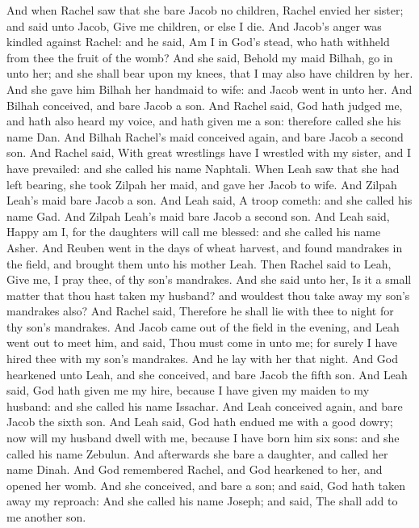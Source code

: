 \begin{biblechapter} %
\verse And when Rachel saw that she bare Jacob no children, Rachel envied her sister; and said unto Jacob, Give me children, or else I die.
\verse And Jacob's anger was kindled against Rachel: and he said, Am I in God's stead, who hath withheld from thee the fruit of the womb?
\verse And she said, Behold my maid Bilhah, go in unto her; and she shall bear upon my knees, that I may also have children by her.
\verse And she gave him Bilhah her handmaid to wife: and Jacob went in unto her.
\verse And Bilhah conceived, and bare Jacob a son.
\verse And Rachel said, God hath judged me, and hath also heard my voice, and hath given me a son: therefore called she his name Dan.
\verse And Bilhah Rachel's maid conceived again, and bare Jacob a second son.
\verse And Rachel said, With great wrestlings have I wrestled with my sister, and I have prevailed: and she called his name Naphtali.
\verse When Leah saw that she had left bearing, she took Zilpah her maid, and gave her Jacob to wife.
\verse And Zilpah Leah's maid bare Jacob a son.
\verse And Leah said, A troop cometh: and she called his name Gad.
\verse And Zilpah Leah's maid bare Jacob a second son.
\verse And Leah said, Happy am I, for the daughters will call me blessed: and she called his name Asher.
\verse And Reuben went in the days of wheat harvest, and found mandrakes in the field, and brought them unto his mother Leah. Then Rachel said to Leah, Give me, I pray thee, of thy son's mandrakes.
\verse And she said unto her, Is it a small matter that thou hast taken my husband? and wouldest thou take away my son's mandrakes also? And Rachel said, Therefore he shall lie with thee to night for thy son's mandrakes.
\verse And Jacob came out of the field in the evening, and Leah went out to meet him, and said, Thou must come in unto me; for surely I have hired thee with my son's mandrakes. And he lay with her that night.
\verse And God hearkened unto Leah, and she conceived, and bare Jacob the fifth son.
\verse And Leah said, God hath given me my hire, because I have given my maiden to my husband: and she called his name Issachar.
\verse And Leah conceived again, and bare Jacob the sixth son.
\verse And Leah said, God hath endued me with a good dowry; now will my husband dwell with me, because I have born him six sons: and she called his name Zebulun.
\verse And afterwards she bare a daughter, and called her name Dinah.
\verse And God remembered Rachel, and God hearkened to her, and opened her womb.
\verse And she conceived, and bare a son; and said, God hath taken away my reproach:
\verse And she called his name Joseph; and said, The \LORD shall add to me another son.

\end{biblechapter}
